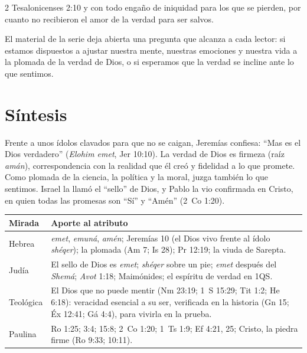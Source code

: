 \begin{verso}{2 Tesalonicenses 2:10}
y con todo engaño de iniquidad para los que se pierden, por cuanto no recibieron el amor de la verdad para ser salvos.
\end{verso}

El material de la serie deja abierta una pregunta que alcanza a cada lector: si estamos dispuestos a ajustar nuestra mente, nuestras emociones y nuestra vida a la plomada de la verdad de Dios, o si esperamos que la verdad se incline ante lo que sentimos.

\section{Síntesis}

\begin{tcolorbox}[colback=papiro,colframe=azul,boxrule=1pt,arc=3pt]
Frente a unos ídolos clavados para que no se caigan, Jeremías confiesa: ``Mas \SENOR{} es el Dios verdadero'' (\emph{Elohim emet}, Jer 10:10). La verdad de Dios es firmeza (raíz \emph{amán}), correspondencia con la realidad que él creó y fidelidad a lo que promete. Como plomada de la ciencia, la política y la moral, juzga también lo que sentimos. Israel la llamó el ``sello'' de Dios, y Pablo la vio confirmada en Cristo, en quien todas las promesas son ``Sí'' y ``Amén'' (2~Co 1:20).
\end{tcolorbox}

\begin{center}\small\renewcommand{\arraystretch}{1.3}
\begin{tabular}{@{}L{3.0cm}L{11.4cm}@{}}
\toprule
\textbf{Mirada} & \textbf{Aporte al atributo} \\ \midrule
Hebrea & \emph{emet}, \emph{emuná}, \emph{amén}; Jeremías 10 (el Dios vivo frente al ídolo \emph{shéqer}); la plomada (Am 7; Is 28); Pr 12:19; la viuda de Sarepta. \\
Judía & El sello de Dios es \emph{emet}; \emph{shéqer} sobre un pie; \emph{emet} después del \emph{Shemá}; \emph{Avot} 1:18; Maimónides; el espíritu de verdad en 1QS. \\
Teológica & El Dios que no puede mentir (Nm 23:19; 1~S 15:29; Tit 1:2; He 6:18): veracidad esencial a su ser, verificada en la historia (Gn 15; Éx 12:41; Gá 4:4), para vivirla en la prueba. \\
Paulina & Ro 1:25; 3:4; 15:8; 2~Co 1:20; 1~Ts 1:9; Ef 4:21, 25; Cristo, la piedra firme (Ro 9:33; 10:11). \\
\bottomrule
\end{tabular}\end{center}

